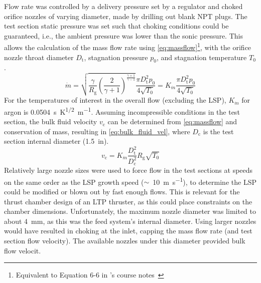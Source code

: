         Flow rate was controlled by a delivery pressure set by a regulator and choked orifice nozzles of varying diameter, made by drilling out blank NPT plugs. The test section static pressure was set such that choking conditions could be guaranteed, i.e., the ambient pressure was lower than the sonic pressure. This allows the calculation of the mass flow rate using \autoref{eq:massflow}\footnote{Equivalent to Equation 6-6 in \citeauthor{zandbergenAE4S01ThermalRocket2020}'s  course notes~\cite{zandbergenAE4S01ThermalRocket2020}}, with the orifice nozzle throat diameter $D_\mathrm{t}$, stagnation pressure $p_0$, and stagnation temperature $T_0$.
        \begin{equation} \label{eq:massflow}
            \dot{m} = \sqrt{\frac{\gamma}{R_\mathrm{g}}\left(\frac{2}{\gamma+1}\right)^\frac{\gamma+1}{\gamma-1}}\frac{\pi D_\mathrm{t}^2p_0}{4\sqrt{T_0}} = K_{\dot{m}}\frac{\pi D_\mathrm{t}^2p_0}{4\sqrt{T_0}}
        \end{equation}
        For the temperatures of interest in the overall flow (excluding the LSP), $K_{\dot{m}}$ for argon is \qty{0.0504}{s.K^{1/2}.m^{-1}}.  Assuming incompressible conditions in the test section, the bulk fluid velocity $v_\mathrm{c}$ can be determined from \autoref{eq:massflow} and conservation of mass, resulting in \autoref{eq:bulk_fluid_vel}, where $D_\mathrm{c}$ is the test section internal diameter (\qty{1.5}{in}).
        \begin{equation} \label{eq:bulk_fluid_vel}
            v_\mathrm{c} = K_{\dot{m}}\frac{D_\mathrm{t}^2}{D_\mathrm{c}^2}R_\mathrm{g}\sqrt{T_0}
        \end{equation}
        Relatively large nozzle sizes were used to force flow in the test sections at speeds on the same order as the LSP growth speed ($\sim$~\qty{10}{m.s^{-1}}), to determine the LSP could be modified or blown out by fast enough flows. This is relevant for the thrust chamber design of an LTP thruster, as this could place constraints on the chamber dimensions. Unfortunately, the maximum nozzle diameter was limited to about \qty{4}{mm}, as this was the feed system's internal diameter. Using larger nozzles would have resulted in choking at the inlet, capping the mass flow rate (and test section flow velocity). The available nozzles under this diameter  provided  bulk flow velocit.

